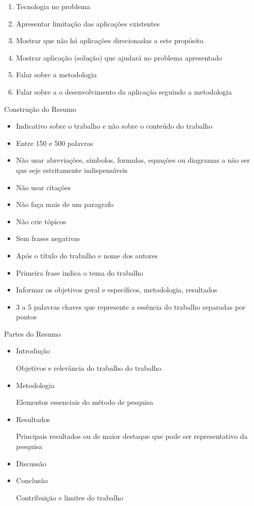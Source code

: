 \begin{enumerate}
\item Tecnologia no problema
\item Apresentar limitação das aplicações existentes
\item Mostrar que não há aplicações direcionadas a este propósito
\item Mostrar aplicação (solução) que ajudará no problema apresentado
\item Falar sobre a metodologia
\item Falar sobre a o desenvolvimento da aplicação seguindo a metodologia
\end{enumerate}


\newpage
{\fontsize{17}{0}\selectfont Construção do Resumo}
\begin{itemize}
\item Indicativo sobre o trabalho e não sobre o conteúdo do trabalho
\item Entre 150 e 500 palavras
\item Não usar abreviações, símbolos, formulas, equações ou diagramas a não ser que seje estritamente indispensáveis
\item Não usar citações
\item Não faça mais de um paragrafo
\item Não crie tópicos
\item Sem frases negativas
\item Após o título do trabalho e nome dos autores
\item Primeira frase indica o tema do trabalho
\item Informar os objetivos geral e específicos, metodologia, resultados 
\item 3 a 5 palavras chaves que represente a essência do trabalho separadas por pontos
\end{itemize}

{\fontsize{17}{0}\selectfont Partes do Resumo}
\begin{itemize}
\item Introdução

Objetivos e relevância do trabalho do trabalho. 
\item Metodologia

Elementos essenciais do método de pesquisa
\item Resultados

Principais resultados ou de maior destaque que pode ser representativo da pesquisa
\item Discussão
\item Conclusão

Contribuição e limites do trabalho
\end{itemize}


